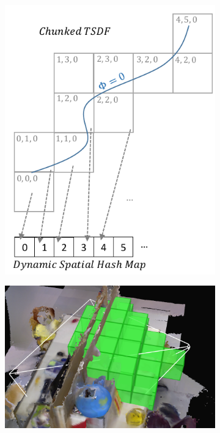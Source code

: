 \documentclass[10pt,twocolumn,letterpaper]{article}
\begin{document}
\begin{figure}
  \centering
  	\begin{subfigure}{0.48\columnwidth} \centering
    \includegraphics[width=1.0\textwidth]{img/chunks.pdf}
      \caption{}
  	\label{fig:chunks} 
  \end{subfigure} 
  \begin{subfigure}{0.48\columnwidth} \centering
      \includegraphics[width=1.0\textwidth]{img/frustum_cull}

\end{subfigure}
\end{figure}
\end{document}
